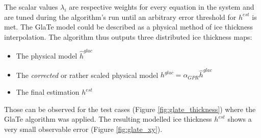 \documentclass[a4, 12pt]{article}
\newcommand{\fref}[1]{(Figure \ref{#1})}
\begin{document}
The scalar values $\lambda_i$ are respective weights for every equation in the system and are tuned during the algorithm's run until an arbitrary error threshold for $h^{est}$ is met. The GlaTe model could be described as a physical method of ice thickness interpolation. The algorithm thus outputs three distributed ice thickness maps:
\begin{itemize}
\item The physical model $\hat{h}^{glac}$
\item The \textit{corrected} or rather scaled physical model $h^{glac} = \alpha_{GPR}\hat{h}^{glac}$
\item The final estimation $h^{est}$
\end{itemize}
Those can be observed for the test cases \fref{fig:glate_thickness} where the GlaTe algorithm was applied. The resulting modelled ice thickness $h^{est}$ shows a very small observable error \fref{fig:glate_xy}. 
\end{document}
